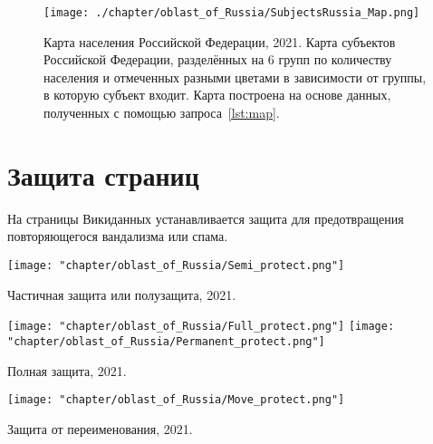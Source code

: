 \begin{fullwidth}
\begin{figure*}[h]
	\texttt{[image: ./chapter/oblast\_of\_Russia/SubjectsRussia\_Map.png]}
	\caption[Карта населения России, 2021.]{Карта населения Российской Федерации, 2021. Карта субъектов Российской Федерации, разделённых на 6 групп по количеству населения и отмеченных разными цветами в зависимости от группы, в которую субъект входит. Карта построена на основе данных, полученных с помощью запроса~\protect\ref{lst:map}.}%
      \label{fig:SubjectsRussiaMap}%
\end{figure*} 
\end{fullwidth}

\section{Защита страниц}

На страницы Викиданных устанавливается защита для предотвращения повторяющегося вандализма или спама. 

\begin{marginfigure}[5.0cm]
{
	\setlength{\fboxsep}{0pt}%
	\setlength{\fboxrule}{1pt}%
	{\texttt{[image: "chapter/oblast\_of\_Russia/Semi\_protect.png"]}}
}
\caption []{Частичная защита или полузащита, 2021.}%
\label{fig:legend_population}%
\end{marginfigure}

\begin{marginfigure}[0.0cm]
{
	\setlength{\fboxsep}{0pt}%
	\setlength{\fboxrule}{1pt}%
	{\texttt{[image: "chapter/oblast\_of\_Russia/Full\_protect.png"]}}
	{\texttt{[image: "chapter/oblast\_of\_Russia/Permanent\_protect.png"]}}
}
\caption []{Полная защита, 2021.}%
\label{fig:legend_population}%
\end{marginfigure}

\begin{marginfigure}[0.0cm]
{
	\setlength{\fboxsep}{0pt}%
	\setlength{\fboxrule}{1pt}%
	{\texttt{[image: "chapter/oblast\_of\_Russia/Move\_protect.png"]}}
}
\caption []{Защита от переименования, 2021.}%
\label{fig:legend_population}%
\end{marginfigure}

